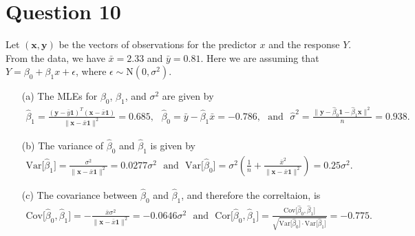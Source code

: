 \documentclass[10pt]{article}
\begin{document}
\section{Question 10} \noindent
Let \((\mathbf{x}, \mathbf{y})\) be the vectors of observations for the predictor \(x\) and the response \(Y\). 
From the data, we have \(\bar{x} = 2.33\) and \(\bar{y} = 0.81\).
Here we are assuming that \(Y = \beta_0 + \beta_1 x + \epsilon\), where \(\epsilon \sim \mathrm{N}(0, \sigma^2)\).
\begin{itemize}
    \item[(a)] The MLEs for \(\beta_0\), \(\beta_1\), and \(\sigma^2\) are given by 
    \begin{align*}
        \hat{\beta}_{1}
        = \frac{(\mathbf{y} - \bar{y}\mathbf{1})^T(\mathbf{x} - \bar{x}\mathbf{1})}{\| \mathbf{x} - \bar{x}\mathbf{1} \|^2}
        = 0.685,
        ~~~
        \hat{\beta}_0
        = \bar{y} - \hat{\beta}_1 \bar{x}
        = -0.786,
        ~~~\mathrm{and}~~~
        \hat{\sigma}^2
        = \frac{\| \mathbf{y} - \hat{\beta}_0 \mathbf{1} - \hat{\beta}_1 \mathbf{x} \|^2}{n}
        = 0.938.
    \end{align*}
    \item[(b)] The variance of \(\hat{\beta}_0\) and \(\hat{\beta}_1\) is given by 
    \begin{align*}
        \mathrm{Var}\big[ \hat{\beta}_1 \big]
        = \frac{\sigma^2}{\| \mathbf{x} - \bar{x}\mathbf{1} \|^2}
        = 0.0277 \sigma^2
        ~~~\mathrm{and}~~~
        \mathrm{Var}\big[ \hat{\beta}_0 \big]
        = \sigma^2 \left( \frac{1}{n} + \frac{\bar{x}^2}{\| \mathbf{x} - \bar{x}\mathbf{1} \|^2} \right)
        = 0.25 \sigma^2.
    \end{align*}
    \item[(c)] The covariance between \(\hat{\beta}_0\) and \(\hat{\beta}_1\), and therefore the correltaion, is 
    \begin{align*}
        \mathrm{Cov}\big[ \hat{\beta}_0, \hat{\beta}_1 \big]
        = - \frac{\bar{x} \sigma^2}{\| \mathbf{x} - \bar{x}\mathbf{1} \|^2}
        = -0.0646 \sigma^2
        ~~~\mathrm{and}~~~
        \mathrm{Cor}\big[ \hat{\beta}_0, \hat{\beta}_1 \big] 
        = \frac{\mathrm{Cov}\big[ \hat{\beta}_0, \hat{\beta}_1 \big]}{\sqrt{\mathrm{Var}\big[ \hat{\beta}_0 \big] \cdot \mathrm{Var}\big[ \hat{\beta}_1 \big]}}
        = -0.775.
    \end{align*}
\end{itemize}
\end{document}

